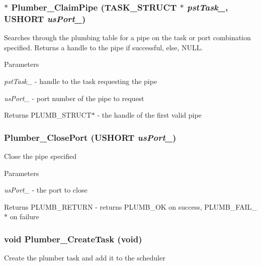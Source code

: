 \subsubsection[{Plumber\_\-ClaimPipe}]{$\ast$ Plumber\_\-ClaimPipe ({\bf TASK\_\-STRUCT} $\ast$ {\em pstTask\_\-}, \/  USHORT {\em usPort\_\-})}\label{plumber_8h_acbb63cbab83f6635a96391168a82233d}
Searches through the plumbing table for a pipe on the task or port combination specified. Returns a handle to the pipe if successful, else, NULL.


\begin{DoxyParams}{Parameters}
\item[{\em pstTask\_\-}]-\/ handle to the task requesting the pipe \item[{\em usPort\_\-}]-\/ port number of the pipe to request \end{DoxyParams}
\begin{DoxyReturn}{Returns}
PLUMB\_\-STRUCT$\ast$ -\/ the handle of the first valid pipe 
\end{DoxyReturn}
\subsubsection[{Plumber\_\-ClosePort}]{ Plumber\_\-ClosePort (USHORT {\em usPort\_\-})}\label{plumber_8h_a37720494d161bd36041fd03411fae7a9}
Close the pipe specified


\begin{DoxyParams}{Parameters}
\item[{\em usPort\_\-}]-\/ the port to close \end{DoxyParams}
\begin{DoxyReturn}{Returns}
PLUMB\_\-RETURN -\/ returns PLUMB\_\-OK on success, PLUMB\_\-FAIL\_\-$\ast$ on failure 
\end{DoxyReturn}
\subsubsection[{Plumber\_\-CreateTask}]{\setlength{\rightskip}{0pt plus 5cm}void Plumber\_\-CreateTask (void)}\label{plumber_8h_add0ce810954566edd607547c4a2a810d}
Create the plumber task and add it to the scheduler 

